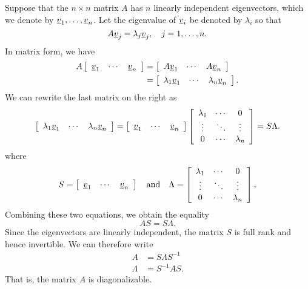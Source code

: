 Suppose that the $n \times n$ matrix $A$ has $n$ linearly independent eigenvectors, which we denote by $\underline{v}_1, \ldots, \underline{v}_n$.
Let the eigenvalue of $\underline{v}_i$ be denoted by $\lambda_i$ so that
\begin{equation*}
A \underline{v}_j = \lambda_j \underline{v}_j, \quad j = 1, \ldots, n.
\end{equation*}
In matrix form, we have
\begin{equation*}
\begin{split}
A \left[ \begin{array}{ccc} \underline{v}_1 & \cdots & \underline{v}_n \end{array} \right]
&= \left[ \begin{array}{ccc} A \underline{v}_1 & \cdots & A \underline{v}_n \end{array} \right] \\
&= \left[ \begin{array}{ccc} \lambda_1 \underline{v}_1 & \cdots & \lambda_n \underline{v}_n \end{array} \right] .
\end{split}
\end{equation*}
We can rewrite the last matrix on the right as
\begin{equation*}
\left[ \begin{array}{ccc} \lambda_1 \underline{v}_1 & \cdots & \lambda_n \underline{v}_n \end{array} \right]
= \left[ \begin{array}{ccc} \underline{v}_1 & \cdots & \underline{v}_n \end{array} \right]
\left[ \begin{array}{ccc}
\lambda_1 & \cdots & 0 \\
\vdots & \ddots & \vdots \\
0 & \cdots & \lambda_n
\end{array} \right]
= S \Lambda .
\end{equation*}
where
\begin{equation*}
S = \left[ \begin{array}{ccc} \underline{v}_1 & \cdots & \underline{v}_n \end{array} \right]
\quad \text{and} \quad
\Lambda = \left[ \begin{array}{ccc}
\lambda_1 & \cdots & 0 \\
\vdots & \ddots & \vdots \\
0 & \cdots & \lambda_n
\end{array} \right] ,
\end{equation*}
Combining these two equations, we obtain the equality
\begin{equation*}
A S = S \Lambda .
\end{equation*}
Since the eigenvectors are linearly independent, the matrix $S$ is full rank and hence invertible.
We can therefore write
\begin{align*}
A &= S \Lambda S^{-1} \\
\Lambda &= S^{-1} A S .
\end{align*}
That is, the matrix $A$ is diagonalizable.

